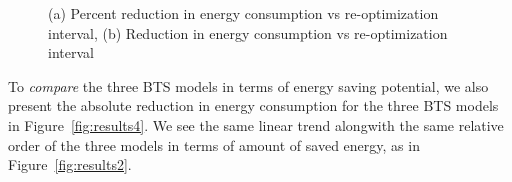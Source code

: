 
\begin{figure}
\centering
{}
\caption{(a) Percent reduction in energy consumption vs re-optimization interval, (b) Reduction in energy consumption vs re-optimization interval} 
\label{fig:results24}
\end{figure}



To \textit{compare} the three BTS models in terms of energy saving potential, we also present the absolute reduction in energy consumption for the three BTS models in Figure~\ref{fig:results4}. We see the same linear trend alongwith the same relative order of the three models in terms of amount of saved energy, as in Figure~\ref{fig:results2}. 

